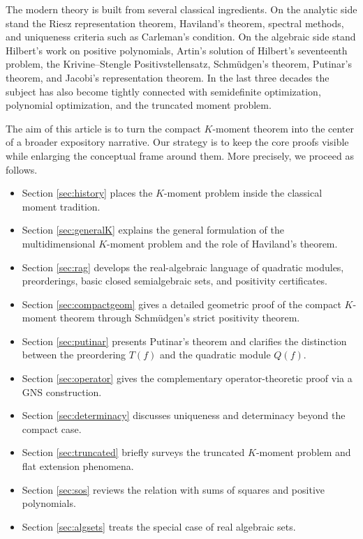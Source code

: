 \documentclass[11pt]{amsart}
\numberwithin{equation}{section}
\theoremstyle{definition}
\theoremstyle{remark}
\newcommand{\1}{\mathbf{1}}
\begin{document}
The modern theory is built from several classical ingredients. On the analytic side stand the Riesz representation theorem, Haviland's theorem, spectral methods, and uniqueness criteria such as Carleman's condition. On the algebraic side stand Hilbert's work on positive polynomials, Artin's solution of Hilbert's seventeenth problem, the Krivine--Stengle Positivstellensatz, Schm\"udgen's theorem, Putinar's theorem, and Jacobi's representation theorem. In the last three decades the subject has also become tightly connected with semidefinite optimization, polynomial optimization, and the truncated moment problem.

The aim of this article is to turn the compact \(K\)-moment theorem into the center of a broader expository narrative. Our strategy is to keep the core proofs visible while enlarging the conceptual frame around them. More precisely, we proceed as follows.

\begin{itemize}[leftmargin=2em]
\item Section \ref{sec:history} places the \(K\)-moment problem inside the classical moment tradition.
\item Section \ref{sec:generalK} explains the general formulation of the multidimensional \(K\)-moment problem and the role of Haviland's theorem.
\item Section \ref{sec:rag} develops the real-algebraic language of quadratic modules, preorderings, basic closed semialgebraic sets, and positivity certificates.
\item Section \ref{sec:compactgeom} gives a detailed geometric proof of the compact \(K\)-moment theorem through Schm\"udgen's strict positivity theorem.
\item Section \ref{sec:putinar} presents Putinar's theorem and clarifies the distinction between the preordering \(T(f)\) and the quadratic module \(Q(f)\).
\item Section \ref{sec:operator} gives the complementary operator-theoretic proof via a GNS construction.
\item Section \ref{sec:determinacy} discusses uniqueness and determinacy beyond the compact case.
\item Section \ref{sec:truncated} briefly surveys the truncated \(K\)-moment problem and flat extension phenomena.
\item Section \ref{sec:sos} reviews the relation with sums of squares and positive polynomials.
\item Section \ref{sec:algsets} treats the special case of real algebraic sets.
\end{itemize}
\end{document}
